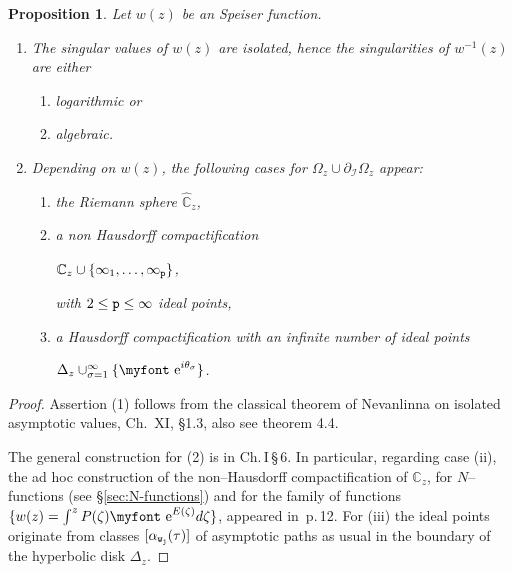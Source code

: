 \documentclass[final,3p,times]{elsarticle}
\newcommand{\CC}{\ensuremath{{\mathbb C}}}
\newcommand{\CW}{\ensuremath{{\widehat{\mathbb C}}}}
\newcommand{\e}{{\text{\myfont e}}}
\newtheorem{proposition}[theorem]{Proposition}
\theoremstyle{definition}
\begin{document}
\begin{proposition}
\label{prop:dos-tipos-singularidades}
Let $w(z)$ be an Speiser function. 

\begin{enumerate}[label=\arabic*),leftmargin=*]
\item
The singular values of $w(z)$ are isolated, 
hence the singularities of $w^{-1}(z)$ are either
\begin{enumerate}[label=\roman*),leftmargin=*]

\item
logarithmic or 

\item
algebraic.
\end{enumerate}

\item
Depending on $w(z)$, the following cases for $\Omega_z \cup \partial_{\mathcal{I}} \Omega_z$
appear:

\begin{enumerate}[label=\roman*),leftmargin=*]

\item
the Riemann sphere $\CW_z$,

\item
a non Hausdorff compactification

\centerline{
$\CC_z \cup \{\infty_{1}, \ldots , \infty_{\tt p}\}$,
}

\noindent
with $2\leq {\tt p} \leq \infty$ ideal points,


\item 
a Hausdorff compactification with an infinite number of ideal points 

\centerline{
$\Delta_z \cup_{\sigma =1}^\infty  \{ \e^{i \theta_{\sigma} } \}$.
}
\end{enumerate}


\end{enumerate}
\end{proposition} 

\begin{proof}
Assertion (1) follows from the classical theorem of Nevanlinna
on isolated asymptotic values, 
\cite{Nevanlinna2} Ch.\, XI, \S1.3, also see
\cite{AlvarezMucino4} theorem 4.4.


The general construction for (2) is in \cite{Ahlfors-Sario}
Ch.\,I\,\S\,6. 
In particular, regarding case (ii), the ad hoc construction
of the non--Hausdorff compactification of $\CC_z$, for $N$--functions
(see \S\ref{sec:N-functions}) and
for the family of functions 
$\{ w(z)= \int^z P(\zeta)\e^{E(\zeta)} d\zeta \}$,
appeared in \cite{AlvarezMucino3}\,p.\,12. 
For (iii) the ideal points originate from 
classes $[\alpha_{{\tt w}_{\tt j}}(\tau)]$ of asymptotic paths
as usual in the boundary of the hyperbolic disk $\Delta_z$. 
\end{proof}
\end{document}
